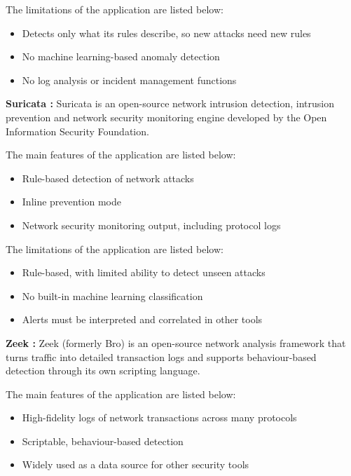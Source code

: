 The limitations of the application are listed below:
\begin{itemize}
    \setlength{\itemsep}{1pt}
    \setlength{\parskip}{0pt}
    \setlength{\parsep}{0pt}
    \item Detects only what its rules describe, so new attacks need new rules
    \item No machine learning-based anomaly detection
    \item No log analysis or incident management functions
\end{itemize}

\vspace{6pt}
\textbf{Suricata \cite{suricata}:} Suricata is an open-source network intrusion detection, intrusion prevention and network security monitoring engine developed by the Open Information Security Foundation.

The main features of the application are listed below:
\begin{itemize}
    \setlength{\itemsep}{1pt}
    \setlength{\parskip}{0pt}
    \setlength{\parsep}{0pt}
    \item Rule-based detection of network attacks
    \item Inline prevention mode
    \item Network security monitoring output, including protocol logs
\end{itemize}

The limitations of the application are listed below:
\begin{itemize}
    \setlength{\itemsep}{1pt}
    \setlength{\parskip}{0pt}
    \setlength{\parsep}{0pt}
    \item Rule-based, with limited ability to detect unseen attacks
    \item No built-in machine learning classification
    \item Alerts must be interpreted and correlated in other tools
\end{itemize}

\vspace{6pt}
\textbf{Zeek \cite{paxson1999bro,zeekweb}:} Zeek (formerly Bro) is an open-source network analysis framework that turns traffic into detailed transaction logs and supports behaviour-based detection through its own scripting language.

The main features of the application are listed below:
\begin{itemize}
    \setlength{\itemsep}{1pt}
    \setlength{\parskip}{0pt}
    \setlength{\parsep}{0pt}
    \item High-fidelity logs of network transactions across many protocols
    \item Scriptable, behaviour-based detection
    \item Widely used as a data source for other security tools
\end{itemize}

